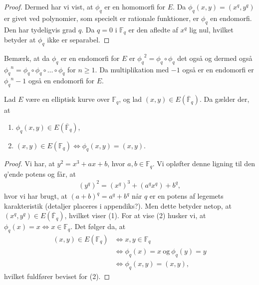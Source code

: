 \begin{proof}
Dermed har vi vist, at $\phi_q$ er en homomorfi for $E$. Da $\phi_q(x, y) = (x^q, y^q)$ er givet ved polynomier, som specielt er rationale funktioner, er $\phi_q$ en endomorfi. Den har tydeligvis grad $q$. Da $q=0$ i $\mathbb{F}_q$ er den afledte af $x^q$ lig nul, hvilket betyder at $\phi_q$ ikke er separabel.
\end{proof}

Bemærk, at da $\phi_q$ er en endomorfi for $E$ er ${\phi_q}^2 = \phi_q \circ \phi_q$ det også og dermed også 
${\phi_q}^n = \phi_q \circ \phi_q \circ \ldots \circ \phi_q$ for $n \geq 1$. Da multiplikation med $-1$ også er en endomorfi er ${\phi_q}^n - 1$ også en endomorfi for $E$.

\begin{lemma}
\label{lemma03}
Lad $E$ være en elliptisk kurve over $\mathbb{F}_q$, og lad 
$(x, y) \in E(\overline{\mathbb{F}}_q)$. Da gælder der, at 
\begin{enumerate}
	\item $\phi_q(x, y) \in E(\overline{\mathbb{F}}_q)$,
	\item $(x, y) \in E(\mathbb{F}_q) \Leftrightarrow \phi_q(x, y)=(x, y)$.
\end{enumerate}
\end{lemma}
\begin{proof}
Vi har, at $y^2 = x^3 + ax + b$, hvor $a, b \in \mathbb{F}_q$. Vi opløfter 
denne ligning til den $q$'ende potens og får, at 
\begin{align*}
	(y^q)^2 = (x^q)^3 + (a^q x^q) + b^q,
\end{align*}
hvor vi har brugt, at $(a+b)^q = a^q + b^q$ når $q$ er en potens af legemets karakteristik 
(detaljer placeres i appendiks?).
Men dette betyder netop, at 
$(x^q, y^q) \in E(\overline{\mathbb{F}}_q)$, hvilket viser (1).
For at vise (2) husker vi, at $\phi_q(x) = x \Leftrightarrow x \in \mathbb{F}_q$.
Det følger da, at 
\begin{align*}
	(x, y) \in E(\mathbb{F}_q) &\Leftrightarrow x, y \in \mathbb{F}_q \\
	&\Leftrightarrow \phi_q(x) = x \ \text{og} \ \phi_q(y) = y \\
	&\Leftrightarrow \phi_q(x, y) = (x, y),
\end{align*}
hvilket fuldfører beviset for (2).
\end{proof}

